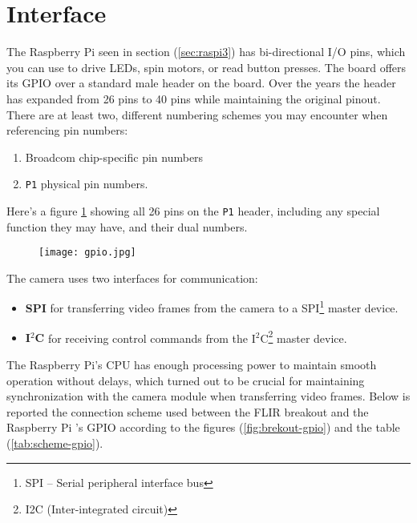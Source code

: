 %
\section{Interface}
\label{sec:lepton-interface}
The Raspberry Pi seen in section (\ref{sec:raspi3}) has bi-directional I/O pins, which you can use to drive LEDs, spin motors, or read button presses.
The board offers its GPIO over a standard male header on the board. Over the years the header has expanded from 26 pins to 40 pins while maintaining the original pinout.
There are at least two, different numbering schemes you may encounter when referencing pin numbers:
\begin{enumerate}
\item Broadcom chip-specific pin numbers 
\item \texttt{P1} physical pin numbers.
\end{enumerate} 
Here's a figure \ref{fig:gpio} showing all 26 pins on the \texttt{P1} header, including any special function they may have, and their dual numbers.
%
%
\begin{figure}[htb]
	\centering
	\texttt{[image: gpio.jpg]}
	\label{fig:gpio}
\end{figure}
%
\newline The camera uses two interfaces for communication:
\begin{itemize}
\item \textbf{SPI} for transferring video frames from the camera to a SPI\footnote{SPI – Serial peripheral interface bus} master device.
\item \textbf{I$^2$C} for receiving control commands from the I$^2$C\footnote{I2C (Inter-integrated circuit)} master device.
\end{itemize}
The Raspberry Pi's CPU  has enough processing power to maintain smooth operation without delays, which turned out to be crucial for maintaining synchronization with the camera module when transferring video frames.
Below is reported the connection scheme used between the
FLIR breakout and the Raspberry Pi 's GPIO according to the figures (\ref{fig:brekout-gpio}) and the table (\ref{tab:scheme-gpio}).  

